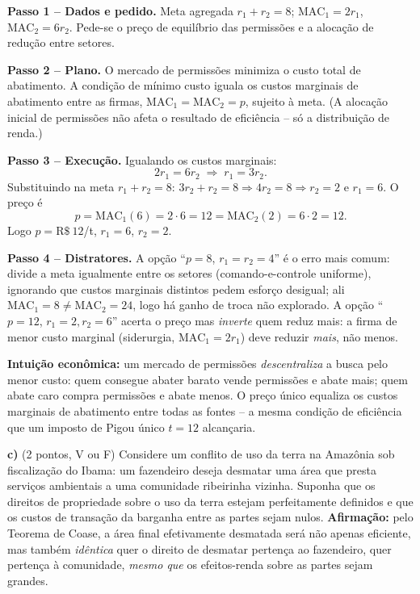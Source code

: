 \begin{solucao}
\textbf{Passo 1 -- Dados e pedido.} Meta agregada $r_1+r_2 = 8$; $\text{MAC}_1=2r_1$, $\text{MAC}_2=6r_2$. Pede-se o pre\c{c}o de equil\'ibrio das permiss\~oes e a aloca\c{c}\~ao de redu\c{c}\~ao entre setores.

\textbf{Passo 2 -- Plano.} O mercado de permiss\~oes minimiza o custo total de abatimento. A condi\c{c}\~ao de m\'inimo custo iguala os custos marginais de abatimento entre as firmas, $\text{MAC}_1 = \text{MAC}_2 = p$, sujeito \`a meta. (A aloca\c{c}\~ao inicial de permiss\~oes n\~ao afeta o resultado de efici\^encia -- s\'o a distribui\c{c}\~ao de renda.)

\textbf{Passo 3 -- Execu\c{c}\~ao.} Igualando os custos marginais:
\[ 2 r_1 = 6 r_2 \;\Longrightarrow\; r_1 = 3 r_2. \]
Substituindo na meta $r_1 + r_2 = 8$: $3 r_2 + r_2 = 8 \Rightarrow 4 r_2 = 8 \Rightarrow r_2 = 2$ e $r_1 = 6$. O pre\c{c}o \'e
\[ p = \text{MAC}_1(6) = 2\cdot 6 = 12 = \text{MAC}_2(2) = 6 \cdot 2 = 12. \]
Logo $p = \text{R\$}~12$/t, $r_1 = 6$, $r_2 = 2$.

\textbf{Passo 4 -- Distratores.} A op\c{c}\~ao ``$p=8$, $r_1=r_2=4$'' \'e o erro mais comum: divide a meta igualmente entre os setores (comando-e-controle uniforme), ignorando que custos marginais distintos pedem esfor\c{c}o desigual; ali $\text{MAC}_1=8 \neq \text{MAC}_2=24$, logo h\'a ganho de troca n\~ao explorado. A op\c{c}\~ao ``$p=12$, $r_1=2, r_2=6$'' acerta o pre\c{c}o mas \emph{inverte} quem reduz mais: a firma de menor custo marginal (siderurgia, $\text{MAC}_1=2r_1$) deve reduzir \emph{mais}, n\~ao menos.

\textbf{Intui\c{c}\~ao econ\^omica:} um mercado de permiss\~oes \emph{descentraliza} a busca pelo menor custo: quem consegue abater barato vende permiss\~oes e abate mais; quem abate caro compra permiss\~oes e abate menos. O pre\c{c}o \'unico equaliza os custos marginais de abatimento entre todas as fontes -- a mesma condi\c{c}\~ao de efici\^encia que um imposto de Pigou \'unico $t=12$ alcan\c{c}aria.
\end{solucao}

\textbf{c)} (2 pontos, V ou F) Considere um conflito de uso da terra na Amaz\^onia sob fiscaliza\c{c}\~ao do Ibama: um fazendeiro deseja desmatar uma \'area que presta servi\c{c}os ambientais a uma comunidade ribeirinha vizinha. Suponha que os direitos de propriedade sobre o uso da terra estejam perfeitamente definidos e que os custos de transa\c{c}\~ao da barganha entre as partes sejam nulos. \textbf{Afirma\c{c}\~ao:} pelo Teorema de Coase, a \'area final efetivamente desmatada ser\'a n\~ao apenas eficiente, mas tamb\'em \emph{id\^entica} quer o direito de desmatar perten\c{c}a ao fazendeiro, quer perten\c{c}a \`a comunidade, \emph{mesmo que} os efeitos-renda sobre as partes sejam grandes.


